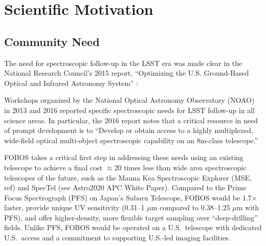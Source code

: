 
\vspace{-0.5cm}
\section{Scientific Motivation}

\subsection{Community Need} The need for spectroscopic follow-up in the LSST era was made clear in
the National Research Council's 2015 report, ``Optimizing the U.S.
Ground-Based Optical and Infrared Astronomy System'' \citep{NAP21722}:
%
\noindent{}

Workshops organized by the National Optical Astronomy Observatory (NOAO)
in 2013 and 2016 reported specific
spectroscopic needs for LSST follow-up in all science areas.  In
particular, the 2016 report notes that a critical resource in need of
prompt development is to ``Develop or obtain access to a highly
multiplexed, wide-field optical multi-object spectroscopic capability on
an 8m-class telescope.''  

FOBOS takes a critical first step in addressing these needs using an existing telescope to achieve a final cost
$\approx$20 times less than wide area spectroscopic telescopes of the future, such as the Mauna Kea Spectroscopic
Explorer (MSE, ref) and SpecTel (see Astro2020 APC White Paper).  Compared to the Prime Focus Spectrograph (PFS) on
Japan's Subaru Telescope, FOBOS would be 1.7$\times$ faster, provide unique UV sensitivity (0.31--1 $\mu$m compared to
0.38--1.25 $\mu$m with PFS), and offer higher-density, more flexible target sampling over ``deep-drilling'' fields.
Unlike PFS, FOBOS would be operated on a U.S.\ telescope with dedicated U.S.\ access and a commitment to supporting
U.S.-led imaging facilities.

